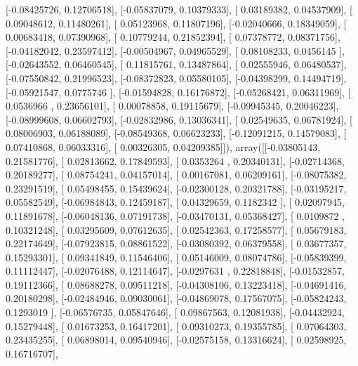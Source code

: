\documentclass{article}
\begin{document}
       [-0.08425726,  0.12706518],
       [-0.05837079,  0.10379333],
       [ 0.03189382,  0.04537909],
       [ 0.09048612,  0.11480261],
       [ 0.05123968,  0.11807196],
       [-0.02040666,  0.18349059],
       [ 0.00683418,  0.07390968],
       [ 0.10779244,  0.21852394],
       [ 0.07378772,  0.08371756],
       [-0.04182042,  0.23597412],
       [-0.00504967,  0.04965529],
       [ 0.08108233,  0.0456145 ],
       [-0.02643552,  0.06460545],
       [ 0.11815761,  0.13487864],
       [ 0.02555946,  0.06480537],
       [-0.07550842,  0.21996523],
       [-0.08372823,  0.05580105],
       [-0.04398299,  0.14494719],
       [-0.05921547,  0.0775746 ],
       [-0.01594828,  0.16176872],
       [-0.05268421,  0.06311969],
       [ 0.0536966 ,  0.23656101],
       [ 0.00078858,  0.19115679],
       [-0.09945345,  0.20046223],
       [-0.08999608,  0.06602793],
       [-0.02832986,  0.13036341],
       [ 0.02549635,  0.06781924],
       [ 0.08006903,  0.06188089],
       [-0.08549368,  0.06623233],
       [-0.12091215,  0.14579083],
       [ 0.07410868,  0.06033316],
       [ 0.00326305,  0.04209385]]), array([[-0.03805143,  0.21581776],
       [ 0.02813662,  0.17849593],
       [ 0.0353264 ,  0.20340131],
       [-0.02714368,  0.20189277],
       [ 0.08754241,  0.04157014],
       [ 0.00167081,  0.06209161],
       [-0.08075382,  0.23291519],
       [ 0.05498455,  0.15439624],
       [-0.02300128,  0.20321788],
       [-0.03195217,  0.05582549],
       [-0.06984843,  0.12459187],
       [ 0.04329659,  0.1182342 ],
       [ 0.02097945,  0.11891678],
       [-0.06048136,  0.07191738],
       [-0.03470131,  0.05368427],
       [ 0.0109872 ,  0.10321248],
       [ 0.03295609,  0.07612635],
       [ 0.02542363,  0.17258577],
       [ 0.05679183,  0.22174649],
       [-0.07923815,  0.08861522],
       [-0.03080392,  0.06379558],
       [ 0.03677357,  0.15293301],
       [ 0.09341849,  0.11546406],
       [ 0.05146009,  0.08074786],
       [-0.05839399,  0.11112447],
       [-0.02076488,  0.12114647],
       [-0.0297631 ,  0.22818848],
       [-0.01532857,  0.19112366],
       [ 0.08688278,  0.09511218],
       [-0.04308106,  0.13223418],
       [-0.04691416,  0.20180298],
       [-0.02484946,  0.09030061],
       [-0.04869078,  0.17567075],
       [-0.05824243,  0.1293019 ],
       [-0.06576735,  0.05847646],
       [ 0.09867563,  0.12081938],
       [-0.04432924,  0.15279448],
       [ 0.01673253,  0.16417201],
       [ 0.09310273,  0.19355785],
       [ 0.07064303,  0.23435255],
       [ 0.06898014,  0.09540946],
       [-0.02575158,  0.13316624],
       [ 0.02598925,  0.16716707],
\end{document}
